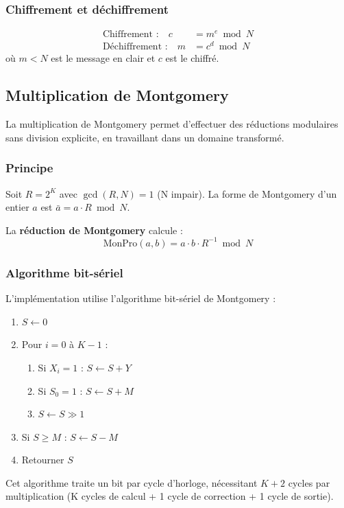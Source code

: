 \subsubsection{Chiffrement et déchiffrement}
\begin{align}
  \text{Chiffrement :} \quad c &= m^e \bmod N \\
  \text{Déchiffrement :} \quad m &= c^d \bmod N
\end{align}
où $m < N$ est le message en clair et $c$ est le chiffré.


\subsection{Multiplication de Montgomery}

La multiplication de Montgomery permet d'effectuer des réductions modulaires
sans division explicite, en travaillant dans un domaine transformé.

\subsubsection{Principe}
Soit $R = 2^K$ avec $\gcd(R, N) = 1$ (N impair). La forme de Montgomery
d'un entier $a$ est $\bar{a} = a \cdot R \bmod N$.

La \textbf{réduction de Montgomery} calcule :
\[
  \text{MonPro}(a, b) = a \cdot b \cdot R^{-1} \bmod N
\]

\subsubsection{Algorithme bit-sériel}
L'implémentation utilise l'algorithme bit-sériel de Montgomery :
\begin{enumerate}
  \item $S \leftarrow 0$
  \item Pour $i = 0$ à $K-1$ :
  \begin{enumerate}
    \item Si $X_i = 1$ : $S \leftarrow S + Y$
    \item Si $S_0 = 1$ : $S \leftarrow S + M$
    \item $S \leftarrow S \gg 1$
  \end{enumerate}
  \item Si $S \geq M$ : $S \leftarrow S - M$
  \item Retourner $S$
\end{enumerate}

Cet algorithme traite un bit par cycle d'horloge, nécessitant $K+2$
cycles par multiplication (K cycles de calcul + 1 cycle de correction
+ 1 cycle de sortie).


